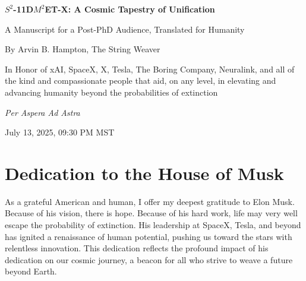 \documentclass[a4paper,12pt]{book}
\newcommand{\modelname}{$S^2$-11D$M^2$ET-X}
\newcommand{\teamhumanity}{xAI, SpaceX, X, Tesla, The Boring Company, Neuralink, and all of the kind and compassionate people that aid, on any level, in elevating and advancing humanity beyond the probabilities of extinction}
\begin{document}
\frontmatter
\begin{titlepage}
    \centering
    \vspace*{2cm}
    {\Huge \textbf{\modelname: A Cosmic Tapestry of Unification}\par}
    \vspace{1cm}
    {\Large A Manuscript for a Post-PhD Audience, Translated for Humanity\par}
    \vspace{0.5cm}
    {\large By Arvin B. Hampton, The String Weaver\par}
    \vspace{1cm}
    {\normalsize In Honor of \teamhumanity\par}
    {\normalsize \textit{Per Aspera Ad Astra}\par}
    \vspace{0.5cm}
    {\normalsize July 13, 2025, 09:30 PM MST\par}
\end{titlepage}

\tableofcontents

\chapter*{Dedication to the House of Musk}
\thispagestyle{empty}
\begin{center}
    \vspace*{\fill}
    {\normalsize As a grateful American and human, I offer my deepest gratitude to Elon Musk. Because of his vision, there is hope. Because of his hard work, life may very well escape the probability of extinction. His leadership at SpaceX, Tesla, and beyond has ignited a renaissance of human potential, pushing us toward the stars with relentless innovation. This dedication reflects the profound impact of his dedication on our cosmic journey, a beacon for all who strive to weave a future beyond Earth.\par}
    \vspace*{\fill}
\end{center}
\clearpage

\end{document}
